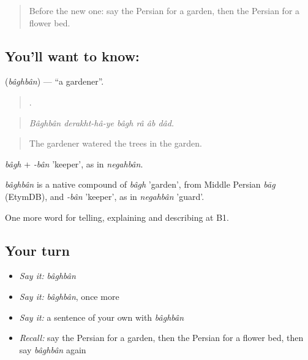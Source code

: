 \label{lesson:FA-C467-baghban}



\begin{quote}
Before the new one: say the Persian for a garden, then the Persian for a flower bed.
\end{quote}

\subsection*{You'll want to know: }
\textbf{} (\emph{bâghbân}) — \textquotedblleft{}a gardener\textquotedblright{}.

\begin{quote}
     .
\end{quote}

\begin{quote}
\emph{Bâghbân derakht-hâ-ye bâgh râ âb dâd.}
\end{quote}

\begin{quote}
The gardener watered the trees in the garden.
\end{quote}

\emph{bâgh} + \emph{-bân} 'keeper', as in \emph{negahbân}.

\begin{cousinweb}
\emph{bâghbân} is a native compound of \emph{bâgh} 'garden', from Middle Persian \emph{bāg} (EtymDB), and \emph{-bân} 'keeper', as in \emph{negahbân} 'guard'.
\end{cousinweb}

\begin{grammarlens}[title={What you've built}]
One more word for telling, explaining and describing at B1.
\end{grammarlens}

\subsection*{Your turn}
\begin{itemize}
\raggedright
  \item \emph{Say it:} \emph{bâghbân}
  \item \emph{Say it:} \emph{bâghbân}, once more
  \item \emph{Say it:} a sentence of your own with \emph{bâghbân}
  \item \emph{Recall:} say the Persian for a garden, then the Persian for a flower bed, then say \emph{bâghbân} again
\end{itemize}

